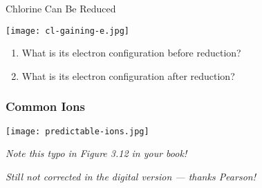 \documentclass[notes=only]{beamer}
\begin{document}
\begin{frame}[t]{Chlorine Can Be Reduced}
	\begin{center}
		\texttt{[image: cl-gaining-e.jpg]}
	\end{center}

	\begin{enumerate}
		\item What is its electron configuration \alert{before}
			reduction?

			\vfill

		\item What is its electron configuration \alert{after} reduction?

			\vfill

			\null
	\end{enumerate}





\end{frame}

\begin{frame}
	\frametitle{Common Ions}
	\noindent
	\begin{center}
		\texttt{[image: predictable-ions.jpg]}

		\bigskip

		\em Note this typo in Figure 3.12 in your book!

		\em Still not corrected in the digital version --- thanks
		Pearson!
	\end{center}
\end{frame}
\end{document}
